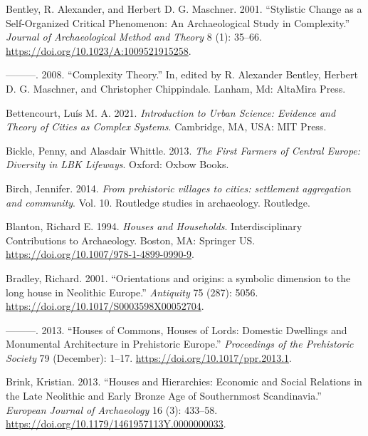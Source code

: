 \documentclass[
  12pt,
  a4paper, twoside]{book}
\newlength{\cslhangindent}
\newlength{\cslentryspacingunit} %
\newenvironment{CSLReferences}[2] %
 {%
  \setlength{\parindent}{0pt}
  \ifodd #1
  \let\oldpar\par
  \def\par{\hangindent=\cslhangindent\oldpar}
  \fi
  \setlength{\parskip}{#2\cslentryspacingunit}
 }%
 {}
\begin{document}
\begin{CSLReferences}{1}{0}
\leavevmode{}%
Bentley, R. Alexander, and Herbert D. G. Maschner. 2001. {``Stylistic {Change} as a {Self-Organized Critical Phenomenon}: {An Archaeological Study} in {Complexity}.''} \emph{Journal of Archaeological Method and Theory} 8 (1): 35--66. \url{https://doi.org/10.1023/A:1009521915258}.

\leavevmode{}%
---------. 2008. {``Complexity Theory.''} In, edited by R. Alexander Bentley, Herbert D. G. Maschner, and Christopher Chippindale. Lanham, Md: AltaMira Press.

\leavevmode{}%
Bettencourt, Luís M. A. 2021. \emph{Introduction to Urban Science: Evidence and Theory of Cities as Complex Systems}. Cambridge, MA, USA: MIT Press.

\leavevmode{}%
Bickle, Penny, and Alasdair Whittle. 2013. \emph{The First Farmers of Central Europe: Diversity in LBK Lifeways}. Oxford: Oxbow Books.

\leavevmode{}%
Birch, Jennifer. 2014. \emph{From prehistoric villages to cities: settlement aggregation and community}. Vol. 10. Routledge studies in archaeology. Routledge.

\leavevmode{}%
Blanton, Richard E. 1994. \emph{Houses and Households}. Interdisciplinary Contributions to Archaeology. Boston, MA: Springer US. \url{https://doi.org/10.1007/978-1-4899-0990-9}.

\leavevmode{}%
Bradley, Richard. 2001. {``Orientations and origins: a symbolic dimension to the long house in Neolithic Europe.''} \emph{Antiquity} 75 (287): 5056. \url{https://doi.org/10.1017/S0003598X00052704}.

\leavevmode{}%
---------. 2013. {``Houses of Commons, Houses of Lords: Domestic Dwellings and Monumental Architecture in Prehistoric Europe.''} \emph{Proceedings of the Prehistoric Society} 79 (December): 1--17. \url{https://doi.org/10.1017/ppr.2013.1}.

\leavevmode{}%
Brink, Kristian. 2013. {``Houses and Hierarchies: Economic and Social Relations in the Late Neolithic and Early Bronze Age of Southernmost Scandinavia.''} \emph{European Journal of Archaeology} 16 (3): 433--58. \url{https://doi.org/10.1179/1461957113Y.0000000033}.


\end{CSLReferences}
\end{document}
